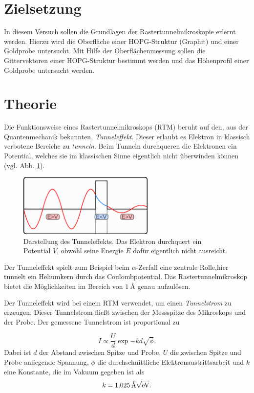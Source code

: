 \setcounter{page}{1}
\section*{Zielsetzung}
In diesem Versuch sollen die Grundlagen der Rastertunnelmikroskopie
erlernt werden.
Hierzu wird die Oberfläche einer HOPG-Struktur (Graphit) und einer
Goldprobe untersucht. Mit Hilfe der Oberflächenmessung sollen die Gittervektoren
einer HOPG-Struktur bestimmt werden und das Höhenprofil einer Goldprobe untersucht werden.

\section{Theorie}
Die Funktionsweise eines Rastertunnelmikroskops (RTM) beruht auf den, aus der Quantenmechanik bekannten, %
\emph{Tunneleffekt}. Dieser erlaubt es Elektron in klassisch verbotene Bereiche zu \emph{tunneln}. %
Beim Tunneln durchqueren die Elektronen ein Potential, welches sie im klassischen Sinne
eigentlich nicht überwinden können (vgl. Abb. \ref{fig: tunneleffekt}).
\begin{figure}[!h]
  \centering
  \includegraphics[width=0.6\textwidth]{./pics/tunelleffekt.png}
  \caption{Darstellung des Tunneleffekts.
  Das Elektron durchquert ein Potential $V$, obwohl seine Energie $E$ dafür eigentlich nicht ausreicht. \cite{tunnel}}
  \label{fig: tunneleffekt}
\end{figure}
Der Tunneleffekt spielt zum Beispiel beim $\alpha$-Zerfall eine zentrale Rolle,hier tunnelt ein Heliumkern durch das Coulombpotential. %
Das Rastertunnelmikroskop bietet die Möglichkeiten im Bereich von $\SI{1}{\angstrom}$ genau aufzulösen. %

Der Tunneleffekt wird bei einem RTM verwendet, um einen \emph{Tunnelstrom} zu erzeugen. Dieser Tunnelstrom
fließt zwischen der Messspitze des Mikroskops und der Probe.
Der gemessene Tunnelstrom ist proportional zu %

\begin{equation}
  \label{eq: tunnelstrom}
I\propto \frac{U}{d}\exp{-kd\sqrt{\phi}}.
\end{equation}
Dabei ist $d$ der Abstand zwischen Spitze und Probe, $U$ die zwischen Spitze und Probe anliegende Spannung,
$\phi$ die durchschnittliche Elektronaustrittsarbeit und $k$ eine Konstante, die im Vakuum gegeben ist als
\begin{equation*}
  k=\SI{1.025}{\per\angstrom\sqrt{\eV}}.
\end{equation*}

